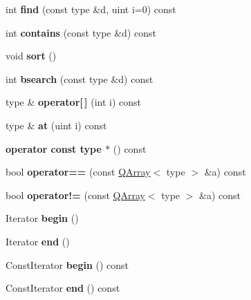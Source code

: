 \begin{DoxyCompactItemize}
int {\bfseries find} (const type \&d, uint i=0) const
\item 
\mbox{\label{class_q_array_a23e0c02768043bf6ba40300555157339}} 
int {\bfseries contains} (const type \&d) const
\item 
\mbox{\label{class_q_array_a2213d4e7a1bd5d601f3d27b40afa518b}} 
void {\bfseries sort} ()
\item 
\mbox{\label{class_q_array_afb9e235369a325d1c9629edd49d9d209}} 
int {\bfseries bsearch} (const type \&d) const
\item 
\mbox{\label{class_q_array_adfcea5a351031bd67939bcc6de558414}} 
type \& {\bfseries operator\mbox{[}$\,$\mbox{]}} (int i) const
\item 
\mbox{\label{class_q_array_a7b077d0281c6abc6c0aa77dfe8239cfb}} 
type \& {\bfseries at} (uint i) const
\item 
\mbox{\label{class_q_array_a037654cb649b2378f35376267692a0c1}} 
{\bfseries operator const type $\ast$} () const
\item 
\mbox{\label{class_q_array_a084f1c892e945c64c1a82df4b833fb1e}} 
bool {\bfseries operator==} (const \mbox{\hyperlink{class_q_array}{Q\+Array}}$<$ type $>$ \&a) const
\item 
\mbox{\label{class_q_array_aa92a475443dee2a933f07340bc36a68e}} 
bool {\bfseries operator!=} (const \mbox{\hyperlink{class_q_array}{Q\+Array}}$<$ type $>$ \&a) const
\item 
\mbox{\label{class_q_array_a9e2df6d5b695fb0fa74036b57c82403a}} 
Iterator {\bfseries begin} ()
\item 
\mbox{\label{class_q_array_a16dfebf13bbbe32f4cf56d90fcd80480}} 
Iterator {\bfseries end} ()
\item 
\mbox{\label{class_q_array_acc7ef85365726cf67699c0310aebce96}} 
Const\+Iterator {\bfseries begin} () const
\item 
\mbox{\label{class_q_array_ac0f673cacf2ba6c0cf284275eabebb5b}} 
Const\+Iterator {\bfseries end} () const
\end{DoxyCompactItemize}
